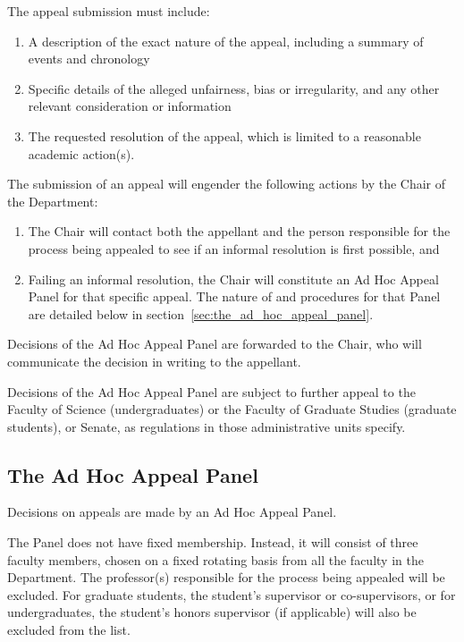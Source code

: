  The appeal submission must include:
\begin{enumerate}

\item A description of the exact nature of the appeal, including a summary of
    events and chronology

\item Specific details of the alleged unfairness, bias or irregularity, and any
    other relevant consideration or information

\item The requested resolution of the appeal, which is limited to a reasonable
    academic action(s). 

\end{enumerate}

 The submission of an appeal will engender the following actions by
the Chair of the Department:

\begin{enumerate}

\item The Chair will contact both the appellant and the person responsible for
the process being appealed to see if an informal resolution is first possible, and

\item Failing an informal resolution, the Chair will constitute an Ad Hoc
Appeal Panel for that specific appeal.  The nature of and procedures for that
Panel are detailed below in section~\ref{sec:the_ad_hoc_appeal_panel}.

\end{enumerate}

 Decisions of the Ad Hoc Appeal Panel are forwarded to the Chair, who
will communicate the decision in writing to the appellant.

 Decisions of the Ad Hoc Appeal Panel are subject to further appeal to
the Faculty of Science (undergraduates) or the Faculty of Graduate Studies
(graduate students), or Senate, as regulations in those administrative units
specify. 


\subsection{\label{sec:the_ad_hoc_appeal_panel}The Ad Hoc Appeal Panel}

 Decisions on appeals are made by an Ad Hoc Appeal Panel.

 The Panel does not have fixed membership.  Instead, it will consist
of three faculty members, chosen on a fixed rotating basis from all the faculty
in the Department.  The professor(s) responsible for the process being appealed
will be excluded.  For graduate students, the student's supervisor or
co-supervisors, or for undergraduates, the student's honors supervisor (if
applicable) will also be excluded from the list.

